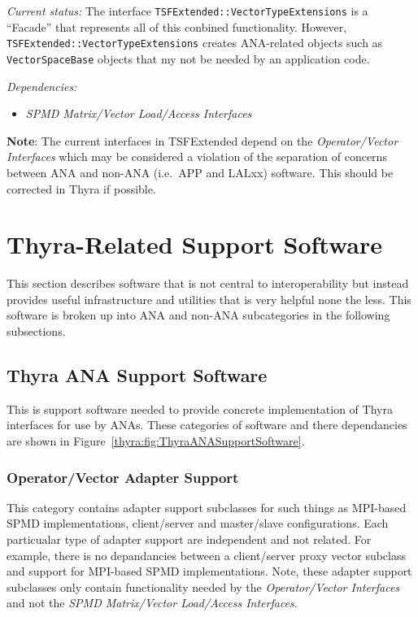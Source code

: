 \documentclass[pdf,ps2pdf,11pt]{SANDreport}
\begin{document}
{}\textit{Current status:} The interface
{}\texttt{TSFExtended::VectorTypeExtensions} is a ``Facade'' that represents
all of this conbined functionality.  However,
{}\texttt{TSFExtended::VectorTypeExtensions} creates ANA-related objects such
as {}\texttt{VectorSpaceBase} objects that my not be needed by an application
code.

{}\textit{Dependencies:}
\begin{itemize}
\item {}\textit{SPMD Matrix/Vector Load/Access Interfaces}
\end{itemize}

{}\textbf{Note}: The current interfaces in TSFExtended depend on the
{}\textit{Operator/Vector Interfaces} which may be considered a violation
of the separation of concerns between ANA and non-ANA (i.e.\ APP and LALxx)
software.  This should be corrected in Thyra if possible.

%
\section{Thyra-Related Support Software}
%

This section describes software that is not central to interoperability but
instead provides useful infrastructure and utilities that is very helpful none
the less.  This software is broken up into ANA and non-ANA subcategories in
the following subsections.

%
\subsection{Thyra ANA Support Software}
%

This is support software needed to provide concrete implementation of Thyra
interfaces for use by ANAs.  These categories of software and there
dependancies are shown in Figure~\ref{thyra:fig:ThyraANASupportSoftware}.

%
\subsubsection{Operator/Vector Adapter Support}
%

This category contains adapter support subclasses for such things as MPI-based
SPMD implementations, client/server and master/slave configurations.  Each
particualar type of adapter support are independent and not related.  For
example, there is no depandancies between a client/server proxy vector
subclass and support for MPI-based SPMD implementations.  Note, these adapter
support subclasses only contain functionality needed by the
{}\textit{Operator/Vector Interfaces} and not the {}\textit{SPMD Matrix/Vector
Load/Access Interfaces}.
\end{document}
